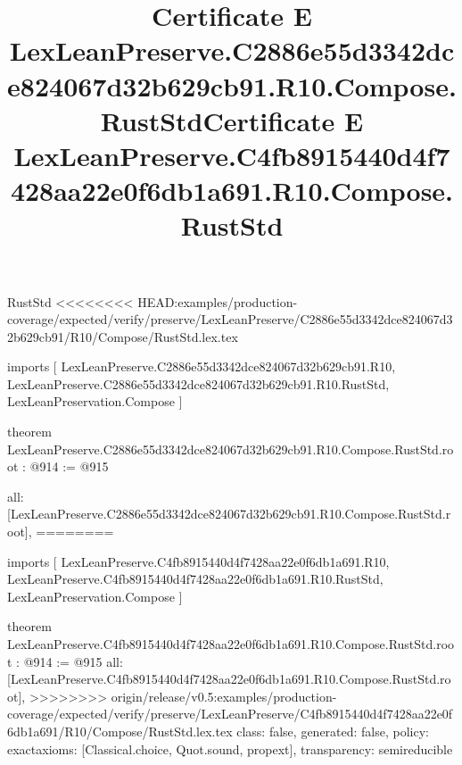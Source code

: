 \begin{lexlean}{RustStd}
<<<<<<<< HEAD:examples/production-coverage/expected/verify/preserve/LexLeanPreserve/C2886e55d3342dce824067d32b629cb91/R10/Compose/RustStd.lex.tex
\title{Certificate E LexLeanPreserve.C2886e55d3342dce824067d32b629cb91.R10.Compose.RustStd}
\begin{coremodule}
imports [
  LexLeanPreserve.C2886e55d3342dce824067d32b629cb91.R10,
  LexLeanPreserve.C2886e55d3342dce824067d32b629cb91.R10.RustStd,
  LexLeanPreservation.Compose
]

theorem LexLeanPreserve.C2886e55d3342dce824067d32b629cb91.R10.Compose.RustStd.root : @914 := @915 {
  all: [LexLeanPreserve.C2886e55d3342dce824067d32b629cb91.R10.Compose.RustStd.root],
========
\title{Certificate E LexLeanPreserve.C4fb8915440d4f7428aa22e0f6db1a691.R10.Compose.RustStd}
\begin{coremodule}
imports [
  LexLeanPreserve.C4fb8915440d4f7428aa22e0f6db1a691.R10,
  LexLeanPreserve.C4fb8915440d4f7428aa22e0f6db1a691.R10.RustStd,
  LexLeanPreservation.Compose
]

theorem LexLeanPreserve.C4fb8915440d4f7428aa22e0f6db1a691.R10.Compose.RustStd.root : @914 := @915 {
  all: [LexLeanPreserve.C4fb8915440d4f7428aa22e0f6db1a691.R10.Compose.RustStd.root],
>>>>>>>> origin/release/v0.5:examples/production-coverage/expected/verify/preserve/LexLeanPreserve/C4fb8915440d4f7428aa22e0f6db1a691/R10/Compose/RustStd.lex.tex
  class: false,
  generated: false,
  policy: exact{axioms: [Classical.choice, Quot.sound, propext]},
  transparency: semireducible
}


\end{coremodule}}
\end{coremodule}
\end{lexlean}
